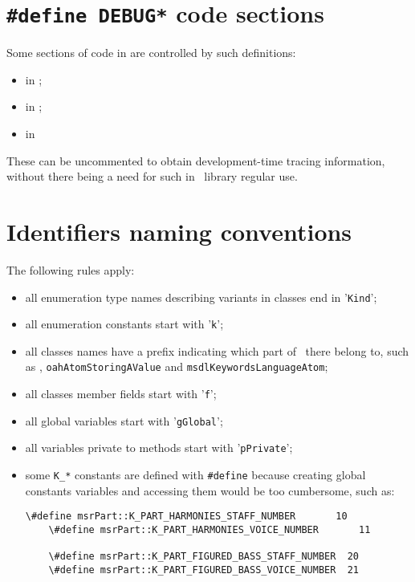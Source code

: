 \section{{\tt \#define DEBUG*} code sections}

Some sections of code in  are controlled by such definitions:
\begin{itemize}
\item {} in ;
\item {} in ;
\item {} in 
\end{itemize}

These can be uncommented to obtain development-time tracing information, without there being a need for such in \mf\ library regular use.


\section{Identifiers naming conventions}

The following rules apply:
\begin{itemize}
\item all enumeration type names describing variants in classes end in '{\tt Kind}';%
\item all enumeration constants start with '{\tt k}';
\item all classes names have a prefix indicating which part of \mf\ there belong to, such as , {\tt oahAtomStoringAValue} and {\tt msdlKeywordsLanguageAtom};
\item all classes member fields start with '{\tt f}';
\item all global variables start with '{\tt gGlobal}';
\item all variables private to methods start with '{\tt pPrivate}';
\item some {\tt K_*} constants are defined with {\tt \#define} because creating global constants variables and accessing them would be too cumbersome, such as:
\begin{lstlisting}[language=CPlusPlus]
    \#define msrPart::K_PART_HARMONIES_STAFF_NUMBER       10
    \#define msrPart::K_PART_HARMONIES_VOICE_NUMBER       11

    \#define msrPart::K_PART_FIGURED_BASS_STAFF_NUMBER  20
    \#define msrPart::K_PART_FIGURED_BASS_VOICE_NUMBER  21
\end{lstlisting}
\end{itemize}

